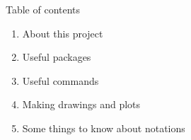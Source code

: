 \begin{frame}{Table of contents}
    
    \begin{enumerate}
        \setlength{\itemsep}{+0.75 cm} %
    	\item About this project
    	\item Useful packages
    	\item Useful commands
    	\item Making drawings and plots
    	\item Some things to know about notations
    \end{enumerate}
\end{frame}